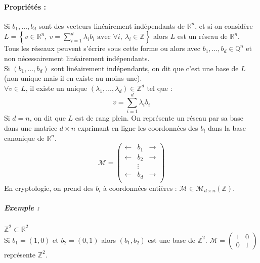 \documentclass[12pt,a4paper]{report}
\begin{document}
\paragraph{Propriétés :\\}
Si $b_1,\ldots,b_d$ sont des vecteurs linéairement indépendants de $\mathbb{R}^n$, et si on considère $L=\left\{v \in \mathbb{R}^n,\ v=\displaystyle \sum_{i=1}^d \lambda_ib_i \mbox{ avec } \forall i,\ \lambda_i \in \mathbb{Z}\right\}$ alors $L$ est un réseau de $\mathbb{R}^n$.\\
Tous les réseaux peuvent s'écrire sous cette forme ou alors avec $b_1,\ldots,b_d \in \mathbb{Q}^n$ et non nécessairement linéairement indépendants.\\
Si $(b_1,\ldots,b_d)$ sont linéairement indépendants, on dit que c'est une base de $L$ (non unique mais il en existe au moins une). \\
$\forall v \in L$, il existe un unique $(\lambda_1,\ldots,\lambda_d) \in \mathbb{Z}^d$ tel que :
$$ v = \sum_{i=1}^d \lambda_ib_i$$
Si $d=n$, on dit que $L$ est de rang plein. On représente un réseau par sa base dans une matrice $d\times n$ exprimant en ligne les coordonnées des $b_i$ dans la base canonique de $\mathbb{R}^n$.
$$ \mathcal{M} =\left( \begin{array}{ccc}
\leftarrow & b_1 & \rightarrow \\
\leftarrow & b_2 & \rightarrow \\
 & \vdots & \\
 \leftarrow & b_d & \rightarrow \\
 \end{array}\right)
 $$
En cryptologie, on prend des $b_i$ à coordonnées entières : $\mathcal{M} \in \mathcal{M}_{d \times n}(\mathbb{Z})$.
\subparagraph{Exemple :} $\mathbb{Z}^2 \subset \mathbb{R}^2$\\
Si $b_1 = (1,0)$ et $b_2 = (0,1)$ alors $(b_1,b_2)$ est une base de $\mathbb{Z}^2$. $\mathcal{M} = \left( \begin{array}{cc} 1 & 0 \\ 0 & 1 \end{array} \right)$ représente $\mathbb{Z}^2$.\\
\end{document}
